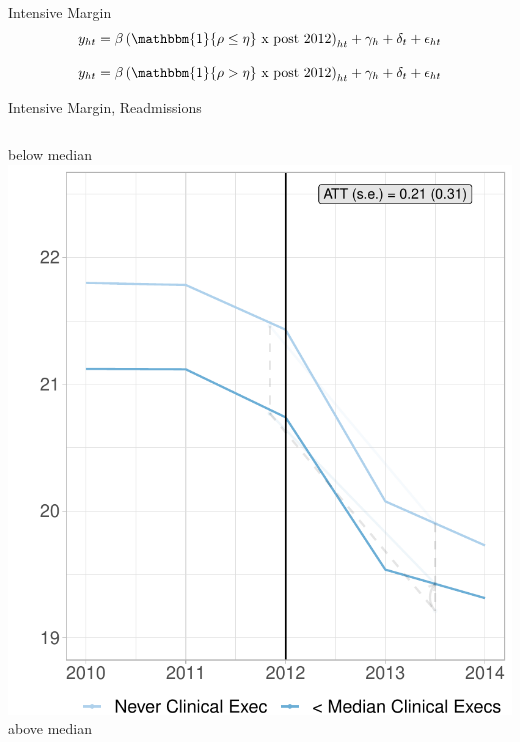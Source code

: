 \documentclass[notes,11pt, aspectratio=169]{beamer}
\begin{document}
\begin{frame}{Intensive Margin}\label{int_margin}
\large
    \begin{equation*}
    y_{ht} = \beta \left(\mathbbm{1}\{\rho \leq \eta\}\text{ x post 2012}\right)_{ht} + \gamma_{h} + \delta_t + \epsilon_{ht}
    \end{equation*}

\vspace{5mm}
    
    \begin{equation*}
    y_{ht} = \beta \left(\mathbbm{1}\{\rho > \eta\}\text{ x post 2012}\right)_{ht} + \gamma_{h} + \delta_t + \epsilon_{ht}
    \end{equation*}
\end{frame}

\begin{frame}{Intensive Margin, Readmissions}
    \begin{columns}
        \centering
        below median
        \includegraphics[width=.8\textwidth]{Objects/cont_belowmedread_md_nomd_synth_graph.pdf}
        \centering
        above median

\end{columns}
\end{frame}
\end{document}
